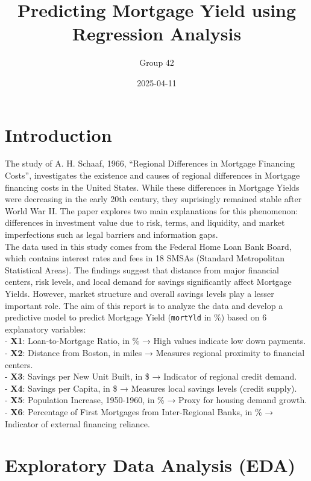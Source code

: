 \documentclass[
  11pt,
]{article}
\title{\textbf{Predicting Mortgage Yield using Regression Analysis}}
\author{Group 42}
\date{2025-04-11}
\begin{document}
\maketitle

\section{Introduction}\label{introduction}

The study of A. H. Schaaf, 1966, ``Regional Differences in Mortgage
Financing Costs'', investigates the existence and causes of regional
differences in Mortgage financing costs in the United States. While
these differences in Mortgage Yields were decreasing in the early 20th
century, they suprisingly remained stable after World War II. The paper
explores two main explanations for this phenomenon: differences in
investment value due to risk, terms, and liquidity, and market
imperfections such as legal barriers and information gaps.\\
\vspace{0.5pt} The data used in this study comes from the Federal Home
Loan Bank Board, which contains interest rates and fees in 18 SMSAs
(Standard Metropolitan Statistical Areas). The findings suggest that
distance from major financial centers, risk levels, and local demand for
savings significantly affect Mortgage Yields. However, market structure
and overall savings levels play a lesser important role. \vspace{0.5pt}
The aim of this report is to analyze the data and develop a predictive
model to predict Mortgage Yield (\texttt{mortYld} in \%) based on 6
explanatory variables:\\
- \textbf{X1}: Loan-to-Mortgage Ratio, in \% → High values indicate low
down payments.\\
- \textbf{X2}: Distance from Boston, in miles → Measures regional
proximity to financial centers.\\
- \textbf{X3}: Savings per New Unit Built, in \$ → Indicator of regional
credit demand.\\
- \textbf{X4}: Savings per Capita, in \$ → Measures local savings levels
(credit supply).\\
- \textbf{X5}: Population Increase, 1950-1960, in \% → Proxy for housing
demand growth.\\
- \textbf{X6}: Percentage of First Mortgages from Inter-Regional Banks,
in \% → Indicator of external financing reliance.

\section{Exploratory Data Analysis
(EDA)}\label{exploratory-data-analysis-eda}
\end{document}
